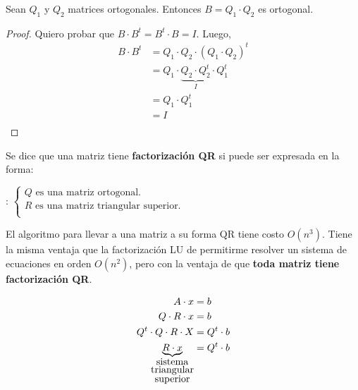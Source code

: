 \documentclass[]{article}
\begin{document}
\begin{prop}\label{prod_orto}
	Sean $Q_1$ y $Q_2$ matrices ortogonales. Entonces $B = Q_1\cdot Q_2$ es ortogonal.
	\begin{proof}
		Quiero probar que $B\cdot B^t = B^t\cdot B=I$. Luego,
		\begin{align*}
			B\cdot B^t &= Q_1\cdot Q_2\cdot (Q_1\cdot Q_2)^t\\
			&= Q_1\cdot \underbrace{Q_2 \cdot Q_2^t}_I \cdot Q_1^t\\
			&= Q_1 \cdot Q_1^t\\
			&= I\\
		\end{align*}
	\end{proof}
\end{prop}

\begin{defi}
	Se dice que una matriz tiene \textbf{factorización QR} si puede ser expresada en la forma:

	\begin{center}
		 :
		$\begin{cases}
			Q \text{ es una matriz ortogonal.}\\
			R \text{ es una matriz triangular superior.}\\
		\end{cases}$
	\end{center}
\end{defi}

El algoritmo para llevar a una matriz a su forma QR tiene costo $O(n^3)$. Tiene la misma ventaja que la factorización LU de permitirme resolver un sistema de ecuaciones en orden $O(n^2)$, pero con la ventaja de que \textbf{toda matriz tiene factorización QR}.

\begin{align*}
	A\cdot x &= b\\
	Q\cdot R\cdot x &= b\\
	Q^t\cdot Q \cdot R\cdot X &= Q^t\cdot b\\
	\underbrace{R\cdot x}_{\substack{$sistema$ \\ $triangular$ \\ $superior$}} &= Q^t \cdot b\\
\end{align*}
\end{document}
